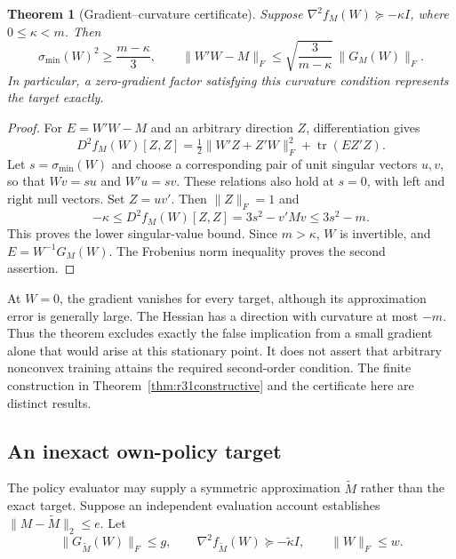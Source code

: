 \documentclass[ecta,nameyear,draft]{econsocart}
\newtheorem{theorem}{Theorem}
\theoremstyle{definition}
\theoremstyle{remark}
\begin{document}
\begin{theorem}[Gradient--curvature certificate]\label{thm:r32geometry}
Suppose $\nabla^2 f_M(W)\succeq-\kappa I$, where $0\leq\kappa<m$.
Then
\begin{equation}\label{eq:r32geometry}
 \sigma_{\min}(W)^2\geq\frac{m-\kappa}{3},\qquad
 \|W'W-M\|_F\leq
       \sqrt{\frac{3}{m-\kappa}}\,\|G_M(W)\|_F.
\end{equation}
In particular, a zero-gradient factor satisfying this curvature condition
represents the target exactly.
\end{theorem}
\begin{proof}
For $E=W'W-M$ and an arbitrary direction $Z$, differentiation gives
\[
 D^2f_M(W)[Z,Z]
   =\tfrac12\|W'Z+Z'W\|_F^2+\operatorname{tr}(E Z'Z).
\]
Let $s=\sigma_{\min}(W)$ and choose a corresponding pair of unit singular
vectors $u,v$, so that $Wv=su$ and $W'u=sv$. These relations also hold at
$s=0$, with left and right null vectors. Set $Z=uv'$. Then $\|Z\|_F=1$ and
\[
 -\kappa\leq D^2f_M(W)[Z,Z]=3s^2-v'Mv\leq3s^2-m.
\]
This proves the lower singular-value bound. Since $m>\kappa$, $W$ is
invertible, and $E=W^{-1}G_M(W)$. The Frobenius norm inequality proves the
second assertion.
\end{proof}

At $W=0$, the gradient vanishes for every target, although its approximation
error is generally large. The Hessian has a direction with curvature at most
$-m$. Thus the theorem excludes exactly the false implication from a small
gradient alone that would arise at this stationary point. It does not assert
that arbitrary nonconvex training attains the required second-order condition.
The finite construction in Theorem~\ref{thm:r31constructive} and the
certificate here are distinct results.

\subsection{An inexact own-policy target}
The policy evaluator may supply a symmetric approximation $\widetilde M$ rather
than the exact target. Suppose an independent evaluation account establishes
$\|M-\widetilde M\|_2\leq e$. Let
\[
 \|G_{\widetilde M}(W)\|_F\leq g,\qquad
 \nabla^2 f_{\widetilde M}(W)\succeq-\widetilde\kappa I,
 \qquad \|W\|_F\leq w.
\]
\end{document}
